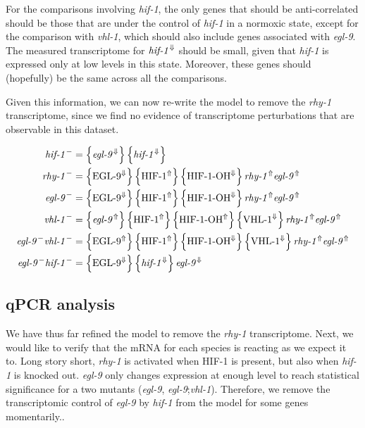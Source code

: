 \documentclass{article}
\newcommand{\transcr}[1]{\left \{ #1 \right \}}
\newcommand{\gene}[1]{\textrm{\emph{#1}}}
\newcommand{\mrna}[1]{\textrm{\emph{#1}}}
\newcommand{\protein}[1]{\textrm{#1}}
\theoremstyle{definition}
\begin{document}
For the comparisons involving \gene{hif-1}, the only genes that should be anti-correlated should be those that are under the control of \gene{hif-1} in a normoxic state, except for the comparison with \gene{vhl-1}, which should also include genes associated with \gene{egl-9}. The measured transcriptome for $\gene{hif-1}^\Downarrow$ should be small, given that \gene{hif-1} is expressed only at low levels in this state. Moreover, these genes should (hopefully) be the same across all the comparisons.


Given this information, we can now re-write the model to remove the \gene{rhy-1} transcriptome, since we find no evidence of transcriptome perturbations that are observable in this dataset.

\begin{align}
  \gene{hif-1}^- &= \transcr{\gene{egl-9}^\Downarrow}\transcr{\gene{hif-1}^\Downarrow}\\
  \gene{rhy-1}^- &= \transcr{\protein{EGL-9}^\Downarrow}\transcr{\protein{HIF-1}^\Uparrow}\transcr{\protein{HIF-1-OH}^\Downarrow}\mrna{rhy-1}^\Uparrow\mrna{egl-9}^\Uparrow \\
  \gene{egl-9}^- &= \transcr{\protein{EGL-9}^\Downarrow}\transcr{\protein{HIF-1}^\Uparrow}\transcr{\protein{HIF-1-OH}^\Downarrow}\mrna{rhy-1}^\Uparrow\mrna{egl-9}^\Uparrow \\
  \gene{vhl-1}^- &= \transcr{\gene{egl-9}^\Uparrow}\transcr{\protein{HIF-1}^\Uparrow}\transcr{\protein{HIF-1-OH}^\Uparrow}\transcr{\protein{VHL-1}^\Downarrow}\mrna{rhy-1}^\Uparrow\mrna{egl-9}^\Uparrow \\
  \gene{egl-9}^-\gene{vhl-1}^- &= \transcr{\protein{EGL-9}^\Uparrow}\transcr{\protein{HIF-1}^\Uparrow}\transcr{\protein{HIF-1-OH}^\Downarrow}\transcr{\protein{VHL-1}^\Downarrow}\mrna{rhy-1}^\Uparrow\mrna{egl-9}^\Uparrow \\
  \gene{egl-9}^-\gene{hif-1}^- &= \transcr{\protein{EGL-9}^\Downarrow}\transcr{\gene{hif-1}^\Downarrow}\mrna{egl-9}^\Downarrow
\end{align}

\subsection{qPCR analysis}

We have thus far refined the model to remove the \gene{rhy-1} transcriptome. Next, we would like to verify that the mRNA for each species is reacting as we expect it to. Long story short, \gene{rhy-1} is activated when \protein{HIF-1} is present, but also when \gene{hif-1} is knocked out. \gene{egl-9} only changes expression at enough level to reach statistical significance for a two mutants (\gene{egl-9}, \gene{egl-9};\gene{vhl-1}). Therefore, we remove the transcriptomic control of \gene{egl-9} by \gene{hif-1} from the model for some genes momentarily..
\end{document}
